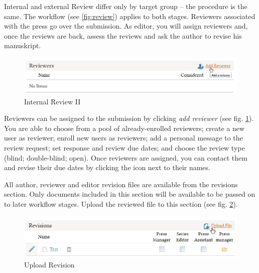 Internal and external Review differ only by target group -- the procedure is the same. The workflow (see \ref{fig:review}) applies to both stages. Reviewers associated with the press go over the submission. As editor, you will assign reviewers and, once the reviews are back, assess the reviews and ask the author to revise his manuskript.

\begin{figure}[h] \centering
\includegraphics[width=1\textwidth]{./img/addReviewer.jpg} \caption{Internal Review II}
\label{fig:addReviewer}
\end{figure}

\newpage

Reviewers can be assigned to the submission by clicking \textit{add reviewer} (see fig. \ref{fig:addReviewer}). You are able to choose from a pool of already-enrolled reviewers; create a new user as reviewer; enroll new users as reviewers; add a personal message to the review request; set response and review due dates; and choose the review type (blind; double-blind; open). Once reviewers are assigned, you can contact them and revise their due dates by clicking the icon next to their names. %

All author, reviewer and editor revision files are available from the revisions section. Only documents included in this section will be available to be passed on to later workflow stages. Upload the reviewed file to this section (see fig. \ref{fig:uploadRevision}).

\begin{figure}[h] \centering
\includegraphics[width=1\textwidth]{./img/uploadRevision.jpg} \caption{Upload Revision}
\label{fig:uploadRevision}
\end{figure}

